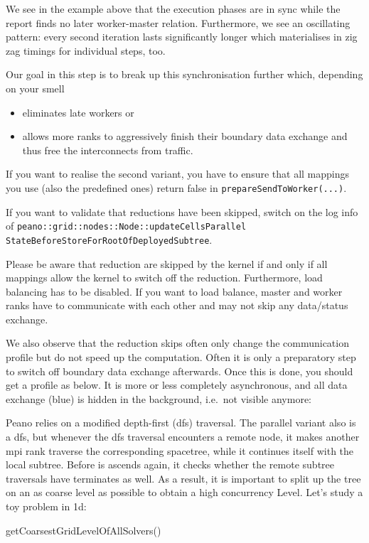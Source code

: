 \noindent
We see in the example above that the execution phases are in sync while the
report finds no later worker-master relation. 
Furthermore, we see an oscillating pattern: every second iteration lasts
significantly longer which materialises in zig zag timings for individual steps,
too.

Our goal in this step is to break up this synchronisation further which,
depending on your smell
\begin{itemize}
  \item eliminates late workers or
  \item allows more ranks to aggressively finish their boundary data exchange
  and thus free the interconnects from traffic.
\end{itemize}



If you want to realise the second variant, you have to
ensure that all mappings you use (also the predefined ones) return false in
\texttt{prepareSendToWorker(...)}.
  
\begin{remark}
  If you want to validate that reductions have been skipped, switch on the log
  info of 
  \texttt{peano::grid::nodes::Node::updateCellsParallel}
  \texttt{StateBeforeStoreForRootOfDeployedSubtree}.
\end{remark}


\noindent
Please be aware that reduction are skipped by the kernel if and only if all
mappings allow the kernel to switch off the reduction.
Furthermore, load balancing has to be disabled.
If you want to load balance, master and worker ranks have to communicate with
each other and may not skip any data/status exchange.

We also observe that the reduction skips often only change the communication
profile but do not speed up the computation. 
Often it is only a preparatory step to switch off boundary data exchange
afterwards.
Once this is done, you should get a profile as below. 
It is more or less completely asynchronous, and all data exchange (blue) is
hidden in the background, i.e.~not visible anymore:




Peano relies on a modified depth-first (dfs) traversal. The parallel variant also is a dfs, but whenever the dfs traversal encounters a remote node, it makes another mpi rank traverse the corresponding spacetree, while it continues itself with the local subtree. Before is ascends again, it checks whether the remote subtree traversals have terminates as well. As a result, it is important to split up the tree on an as coarse level as possible to obtain a high concurrency Level. Let's study a toy problem in 1d:


getCoarsestGridLevelOfAllSolvers()

